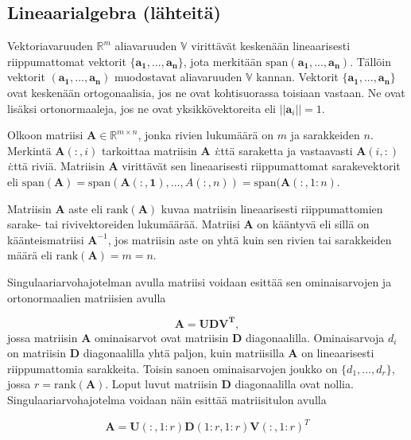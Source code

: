 \subsection{Lineaarialgebra (lähteitä)}
Vektoriavaruuden $\mathbb{R}^m$ aliavaruuden $\mathbb{V}$ virittävät keskenään lineaarisesti riippumattomat vektorit $\{\mathbf{a_1,...,a_n}\}$, jota merkitään $\text{span}(\mathbf{a_1,...,a_n})$. Tällöin vektorit $(\mathbf{a_1,...,a_n})$ muodostavat aliavaruuden $\mathbb{V}$ kannan. Vektorit $\{\mathbf{a_1,...,a_n}\}$ ovat keskenään ortogonaalisia, jos ne ovat kohtisuorassa toisiaan vastaan. Ne ovat lisäksi ortonormaaleja, jos ne ovat yksikkövektoreita eli $||\mathbf{a}_i||=1$.

Olkoon matriisi $\mathbf{A}\in \mathbb{R}^{m\times n}$, jonka rivien lukumäärä on $\mathit{m}$ ja sarakkeiden $\mathit{n}$. Merkintä $\mathbf{A}(:,i)$ tarkoittaa matriisin \textbf{A} \textit{i}:ttä saraketta ja vastaavasti $\mathbf{A}(i,:)$ \textit{i}:ttä riviä. Matriisin \textbf{A} virittävät sen lineaarisesti riippumattomat sarakevektorit eli $\text{span}(\mathbf{A}) = \text{span}(\mathbf{A(:,1)},...,A(:,n)) = \text{span}(\mathbf{A}(:,1:n)$. 

Matriisin \textbf{A} aste eli $\text{rank}(\textbf{A})$ kuvaa matriisin lineaarisesti riippumattomien sarake- tai rivivektoreiden lukumäärää. Matriisi \textbf{A} on kääntyvä eli sillä on käänteismatriisi $\mathbf{A}^{-1}$, jos matriisin aste on yhtä kuin sen rivien tai sarakkeiden määrä eli $\text{rank}(\textbf{A})=m=n$.

Singulaariarvohajotelman avulla matriisi voidaan esittää sen ominaisarvojen ja ortonormaalien matriisien avulla

\begin{equation}
    \mathbf{A = UDV^T,}
\end{equation}
jossa matriisin $\mathbf{A}$ ominaisarvot ovat matriisin $\mathbf{D}$ diagonaalilla. Ominaisarvoja $d_i$ on matriisin $\mathbf{D}$ diagonaalilla yhtä paljon, kuin matriisilla $\mathbf{A}$ on lineaarisesti riippumattomia sarakkeita. Toisin sanoen ominaisarvojen joukko on $\{d_1,...,d_r\}$, jossa $r = \text{rank}(\mathbf{A})$. Loput luvut matriisin \textbf{D} diagonaalilla ovat nollia. Singulaariarvohajotelma voidaan näin esittää matriisitulon avulla 

\begin{equation}
    \mathbf{A} = \mathbf{U}(:,1:r)\mathbf{D}(1:r,1:r)\mathbf{V}(:,1:r)^T
    \label{eq:2}
\end{equation}


